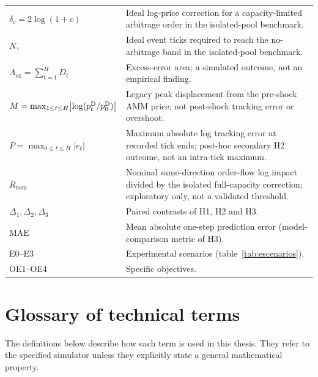\begin{center}
\begin{tabularx}{\textwidth}{@{}l X@{}}
$\delta_c=2\log(1+c)$ & Ideal log-price correction for a capacity-limited arbitrage order in the isolated-pool benchmark. \\
$N_\gamma$ & Ideal event ticks required to reach the no-arbitrage band in the isolated-pool benchmark. \\
$A_{\mathrm{ex}} = \sum_{t=1}^{H} D_t$ & Excess-error area; a simulated outcome, not an empirical finding. \\
$M = \max_{1\le t\le H}\bigl|\log(p^{\mathrm{D}}_t/p^{\mathrm{D}}_0)\bigr|$ & Legacy peak displacement from the pre-shock AMM price; not post-shock tracking error or overshoot. \\
$P = \max_{0\le t\le H}|e_t|$ & Maximum absolute log tracking error at recorded tick ends; post-hoc secondary H2 outcome, not an intra-tick maximum. \\
$R_{\mathrm{nom}}$ & Nominal same-direction order-flow log impact divided by the isolated full-capacity correction; exploratory only, not a validated threshold. \\
$\Delta_1,\Delta_2,\Delta_3$ & Paired contrasts of H1, H2 and H3. \\
$\mathrm{MAE}$ & Mean absolute one-step prediction error (model-comparison metric of H3). \\
E0--E3 & Experimental scenarios (table~\ref{tab:escenarios}). \\
OE1--OE4 & Specific objectives. \\
\bottomrule
\end{tabularx}
\end{center}

\section*{Glossary of technical terms}
{}

\begingroup
\small
\setlength{\parskip}{0.15em}
The definitions below describe how each term is used in this thesis. They refer to
the specified simulator unless they explicitly state a general mathematical property.


